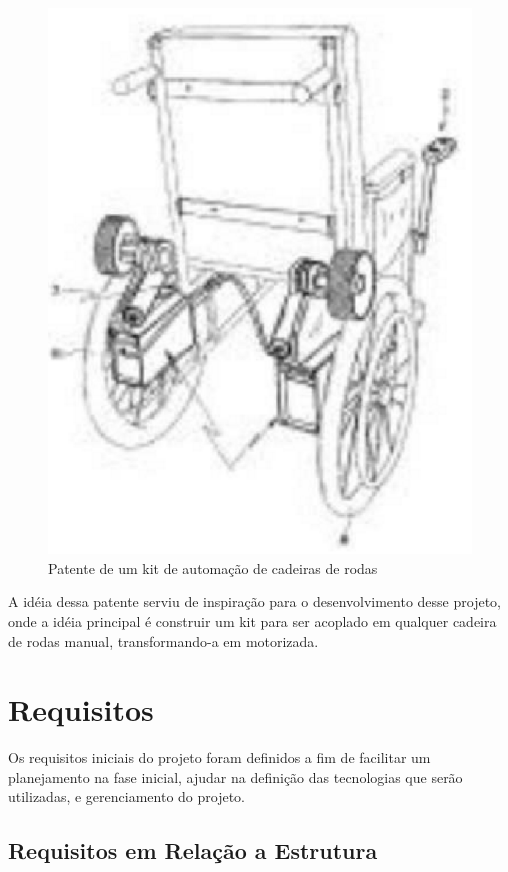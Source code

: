 \begin{figure}[!htb]
  \centering
  \includegraphics[keepaspectratio=true,scale=0.50]{figuras/introducao/kit_motorizacao}
  \caption{Patente de um kit de automação de cadeiras de rodas}
  \label{fig:kit_motorizacao}
\end{figure}

A idéia dessa patente serviu de inspiração para o desenvolvimento desse projeto, onde a idéia principal é construir um kit para ser acoplado em qualquer cadeira de rodas manual, transformando-a em motorizada.

\section{Requisitos}

Os requisitos iniciais do projeto foram definidos a fim de facilitar um planejamento na fase inicial, ajudar na definição das tecnologias que serão utilizadas, e gerenciamento do projeto.

\subsection{Requisitos em Relação a Estrutura}

